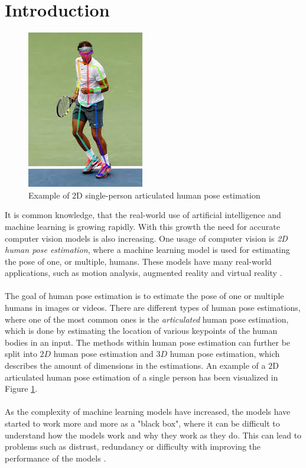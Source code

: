 \documentclass[./main.tex]{subfiles}
\begin{document}
\section{Introduction}
\begin{figure}[htbp]
    \centering
    \includegraphics[height = 6 cm]{./entities/pose_estimation_example_img.jpg}
    \caption{Example of 2D single-person articulated human pose estimation \cite{pose_estimation_example}}
    \label{fig:pose_estimation_example_fig}
\end{figure}
\noindent It is common knowledge, that the real-world use of artificial intelligence and machine learning is growing rapidly. With this growth the need for accurate computer vision models is also increasing. One usage of computer vision is \textit{2D human pose estimation}, where a machine learning model is used for estimating the pose of one, or multiple, humans. These models have many real-world applications, such as motion analysis, augmented reality and virtual reality \cite{survey_2}.
\\
\\
The goal of human pose estimation is to estimate the pose of one or multiple humans in images or videos. There are different types of human pose estimations, where one of the most common ones is the \textit{articulated} human pose estimation, which is done by estimating the location of various keypoints of the human bodies in an input. The methods within human pose estimation can further be split into $2D$ human pose estimation and $3D$ human pose estimation, which describes the amount of dimensions in the estimations. An example of a $2$D articulated human pose estimation of a single person has been visualized in Figure \ref{fig:pose_estimation_example_fig}.
\\
\\
As the complexity of machine learning models have increased, the models have started to work more and more as a "black box", where it can be difficult to understand how the models work and why they work as they do. This can lead to problems such as distrust, redundancy or difficulty with improving the performance of the models \cite{Selvaraju}.
\end{document}
